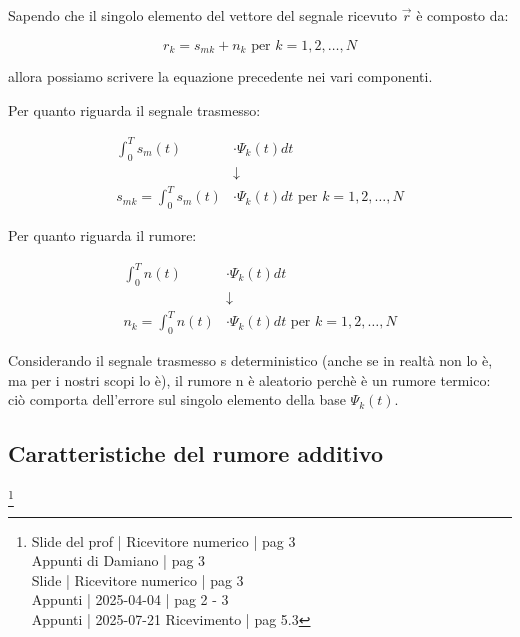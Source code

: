 Sapendo che il singolo elemento del vettore del segnale ricevuto $\overrightarrow{r}$ è composto da: 

{
    \Large
    \begin{equation}
        r_k = s_{mk} + n_k \text{ per } k = 1, 2, \dots, N
    \end{equation}
}

allora possiamo scrivere la equazione precedente nei vari componenti. \newline 

Per quanto riguarda il segnale trasmesso: 

{
    \Large 
    \begin{equation}
        \begin{split}
        \int_{0}^{T}
        s_m (t)
        &\cdot 
        \Psi_k (t)
        dt
        \\
        &\downarrow
        \\
        s_{mk} 
        =
        \int_{0}^{T}
        s_m (t)
        &\cdot 
        \Psi_k (t)
        dt 
        \text{ per } k = 1, 2, \dots, N
        \end{split}
    \end{equation}
}

Per quanto riguarda il rumore: 

{
    \Large 
    \begin{equation}
        \begin{split}
        \int_{0}^{T}
        n(t)
        &\cdot 
        \Psi_k (t)
        dt
        \\
        &\downarrow
        \\
        n_{k} 
        =
        \int_{0}^{T}
        n (t)
        &\cdot 
        \Psi_k (t)
        dt 
        \text{ per } k = 1, 2, \dots, N
        \end{split}
    \end{equation}
}

Considerando il segnale trasmesso s deterministico (anche se in realtà non lo è, ma per i nostri scopi lo è),
il rumore n è aleatorio perchè è un rumore termico: ciò comporta dell'errore sul singolo elemento della base $\Psi_k (t)$. \newline 

\newpage 

\subsection{Caratteristiche del rumore additivo}
\footnote{Slide del prof | Ricevitore numerico | pag 3 \\  
Appunti di Damiano | pag 3 \\
Slide | Ricevitore numerico | pag 3 \\
Appunti | 2025-04-04 | pag 2 - 3 \\
Appunti | 2025-07-21 Ricevimento | pag 5.3
}

